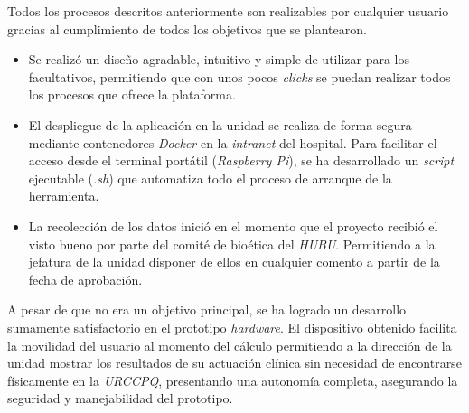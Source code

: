 Todos los procesos descritos anteriormente son realizables por cualquier usuario gracias al cumplimiento de todos los objetivos que se plantearon. \pageref{ch:objetivos} 

\begin{itemize}
	\item Se realizó un diseño agradable, intuitivo y simple de utilizar para los facultativos, permitiendo que con unos pocos \textit{clicks} se puedan realizar todos los procesos que ofrece la plataforma.
	
	\item El despliegue de la aplicación en la unidad se realiza de forma segura mediante contenedores \textit{Docker} en la \textit{intranet} del hospital. Para facilitar el acceso desde el terminal portátil (\textit{Raspberry Pi}), se ha desarrollado un \textit{script} ejecutable (\textit{.sh}) que automatiza todo el proceso de arranque de la herramienta.
	
	\item La recolección de los datos inició en el momento que el proyecto recibió el visto bueno por parte del comité de bioética del \textit{HUBU}. Permitiendo a la jefatura de la unidad disponer de ellos en cualquier comento a partir de la fecha de aprobación.
	
\end{itemize}

A pesar de que no era un objetivo principal, se ha logrado un desarrollo sumamente satisfactorio en el prototipo \textit{hardware}. El dispositivo obtenido facilita la
movilidad del usuario al momento del cálculo permitiendo a la dirección de la unidad mostrar los resultados de su actuación clínica sin necesidad de encontrarse físicamente en la \textit{URCCPQ}, presentando una autonomía completa, asegurando la seguridad y manejabilidad del prototipo.
 

